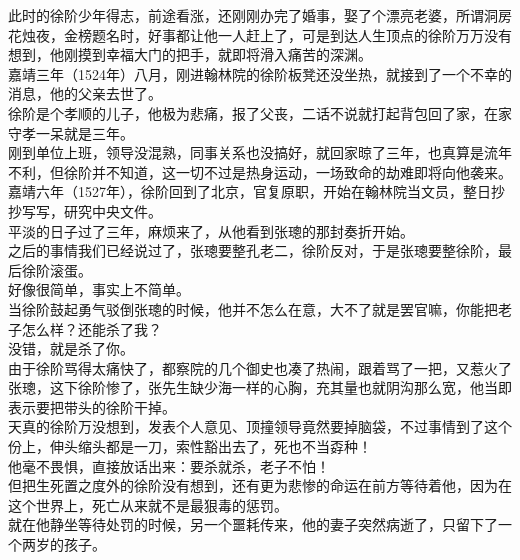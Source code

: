 \begin{multicols}{\theparacolNo}
此时的徐阶少年得志，前途看涨，还刚刚办完了婚事，娶了个漂亮老婆，所谓洞房花烛夜，金榜题名时，好事都让他一人赶上了，可是到达人生顶点的徐阶万万没有想到，他刚摸到幸福大门的把手，就即将滑入痛苦的深渊。\\

嘉靖三年（1524年）八月，刚进翰林院的徐阶板凳还没坐热，就接到了一个不幸的消息，他的父亲去世了。\\

徐阶是个孝顺的儿子，他极为悲痛，报了父丧，二话不说就打起背包回了家，在家守孝一呆就是三年。\\

刚到单位上班，领导没混熟，同事关系也没搞好，就回家晾了三年，也真算是流年不利，但徐阶并不知道，这一切不过是热身运动，一场致命的劫难即将向他袭来。\\

嘉靖六年（1527年），徐阶回到了北京，官复原职，开始在翰林院当文员，整日抄抄写写，研究中央文件。\\

平淡的日子过了三年，麻烦来了，从他看到张璁的那封奏折开始。\\

之后的事情我们已经说过了，张璁要整孔老二，徐阶反对，于是张璁要整徐阶，最后徐阶滚蛋。\\

好像很简单，事实上不简单。\\

当徐阶鼓起勇气驳倒张璁的时候，他并不怎么在意，大不了就是罢官嘛，你能把老子怎么样？还能杀了我？\\

没错，就是杀了你。\\

由于徐阶骂得太痛快了，都察院的几个御史也凑了热闹，跟着骂了一把，又惹火了张璁，这下徐阶惨了，张先生缺少海一样的心胸，充其量也就阴沟那么宽，他当即表示要把带头的徐阶干掉。\\

天真的徐阶万没想到，发表个人意见、顶撞领导竟然要掉脑袋，不过事情到了这个份上，伸头缩头都是一刀，索性豁出去了，死也不当孬种！\\

他毫不畏惧，直接放话出来：要杀就杀，老子不怕！\\

但把生死置之度外的徐阶没有想到，还有更为悲惨的命运在前方等待着他，因为在这个世界上，死亡从来就不是最狠毒的惩罚。\\

就在他静坐等待处罚的时候，另一个噩耗传来，他的妻子突然病逝了，只留下了一个两岁的孩子。\\


\end{multicols}
